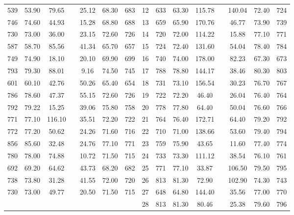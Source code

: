 \documentclass[nocover]{cumcmart}%
\begin{document}
\begin{table}[!htbp]
\begin{tabular}{ccccccccccccccc}
            539  &  53.90  &  79.65   &  &  25.12  &  68.30  &  683  &  12  &  633  &   63.30  &  115.78   &   &  140.04  &   72.40   &   724   \\
            746  &  74.60  &  44.93   &  &  15.28  &  68.80  &  688  &  13  &  659  &   65.90  &  170.76   &   &  46.77   &   73.90   &   739   \\
            730  &  73.00  &  36.00   &  &  23.15  &  72.60  &  726  &  14  &  720  &   72.00  &  114.22   &   &  15.88   &   77.10   &   771   \\
            587  &  58.70  &  85.56   &  &  41.34  &  65.70  &  657  &  15  &  724  &   72.40  &  131.60   &   &  54.04   &   78.40   &   784   \\
            749  &  74.90  &  18.10   &  &  20.10  &  69.90  &  699  &  16  &  740  &   74.00  &  178.00   &   &  82.23   &   67.30   &   673   \\
            793  &  79.30  &  88.01   &  &  9.16   &  74.50  &  745  &  17  &  788  &   78.80  &  144.17   &   &  38.46   &   80.30   &   803   \\
            601  &  60.10  &  42.76   &  &  50.26  &  65.40  &  654  &  18  &  731  &   73.10  &  156.54   &   &  30.23   &   76.70   &   767   \\
            786  &  78.60  &  47.37   &  &  55.15  &  72.60  &  726  &  19  &  722  &   72.20  &  46.40    &   &  26.04   &   76.40   &   764   \\
            792  &  79.22  &  15.25   &  &  39.06  &  75.80  &  758  &  20  &  778  &   77.80  &  64.40    &   &  50.04   &   76.60   &   766   \\
            771  &  77.10  &  116.10  &  &  35.51  &  72.20  &  722  &  21  &  764  &   76.40  &  172.71   &   &  64.40   &   79.20   &   792   \\
            772  &  77.20  &  50.62   &  &  24.26  &  71.60  &  716  &  22  &  710  &   71.00  &  138.66   &   &  53.60   &   79.40   &   794   \\
            856  &  85.60  &  32.48   &  &  24.76  &  77.10  &  771  &  23  &  759  &   75.90  &  43.65    &   &  11.60   &   77.40   &   774   \\
            780  &  78.00  &  74.88   &  &  10.72  &  71.50  &  715  &  24  &  733  &   73.30  &  111.12   &   &  38.54   &   76.10   &   761   \\
            692  &  69.20  &  64.62   &  &  43.73  &  68.20  &  682  &  25  &  771  &   77.10  &  33.87    &   &  106.50  &   79.50   &   795   \\
            738  &  73.80  &  31.28   &  &  41.55  &  72.00  &  720  &  26  &  813  &   81.30  &  72.90    &   &  102.90  &   74.30   &   743   \\
            730  &  73.00  &  49.77   &  &  20.50  &  71.50  &  715  &  27  &  648  &   64.80  &  144.40   &   &  35.56   &   77.00   &   770   \\
                 &         &          &  &         &         &       &  28  &  813  &   81.30  &  80.46    &   &  25.38   &   79.60   &   796   \\


\end{tabular}
\end{table}
\end{document}
